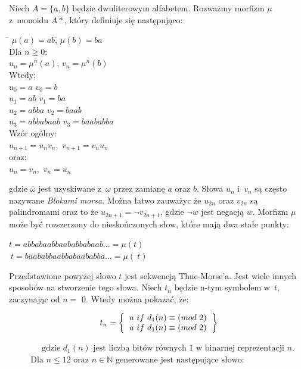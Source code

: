\documentclass[document]{xmgr}
\begin{document}
Niech $A = \{a, b\}$ będzie dwuliterowym alfabetem. Rozważmy morfizm $\mu$ z~monoidu $A*$, który definiuje się następująco:



\begin{tabbing}

\hspace{8em}\= $\mu(a) = ab$,\hspace{7em}\= $\mu(b) = ba$\\
Dla $n \geq 0$:\\
\> $u_n = \mu^n(a)$,\> $v_n = \mu^n(b)$\\
Wtedy:\\
\> $u_0 = a$ \> $v_0 = b$\\
\> $u_1 = ab$ \> $v_1 = ba$\\
\> $u_2 = abba$	 \> $v_2 = baab$\\
\> $u_3 = abbabaab$ \> $v_3 = baababba$\\
Wzór ogólny:\\
\> $u_{n+1} = u_n v_n,$ \> $v_{n+1} = v_n u_n$\\
oraz:\\
\> $u_n = \overline{v}_n,$ \> $v_n = \overline{u}_n$
\end{tabbing}

gdzie $\overline{\omega}$ jest uzyskiwane z~$\omega$ przez zamianę $a$ oraz $b$. Słowa $u_n$ i~$v_n$ są często nazywane \emph{Blokami morsa}. Można łatwo zauważyc że $u_{2n}$ oraz $v_{2n}$ są palindromami oraz to że $u_{2n+1} = \neg v_{2n+1}$, gdzie $\neg w$ jest negacją $w$. Morfizm $\mu$ może być rozszerzony do nieskończonych słow, które mają dwa stałe punkty:

{\centering 
$t = abbabaabbaababbabaab... = \mu(t)$ \\
$~t = baababbaabbabaababba... = \mu(~t)$
\par}

Przedstawione powyżej słowo $t$ jest sekwencją Thue-Morse'a. Jest wiele innych sposobów na stworzenie tego słowa. Niech $t_n$ będzie n-tym symbolem w~$t$, zaczynając od $n =$ 0. Wtedy można pokazać, że:

\[
t_n=
\left \{
\begin{tabular}{ccc}
$a\ if\ d_1(n) \equiv (mod\ 2)$ \\
$a\ if\ d_1(n) \equiv (mod\ 2)$
\end{tabular}
\right \}
\]

\begin{align*}
  &\phantom{{}\leq{}} \text{gdzie } d_1(n) \text{ jest liczbą bitów równych 1 w binarnej reprezentacji } n \text{.}  \\
  & \text{Dla } n \leq 12 \text{ oraz } n \in \mathbb{N} \text{ generowane jest następujące słowo:}  \\
\end{align*}
\end{document}
